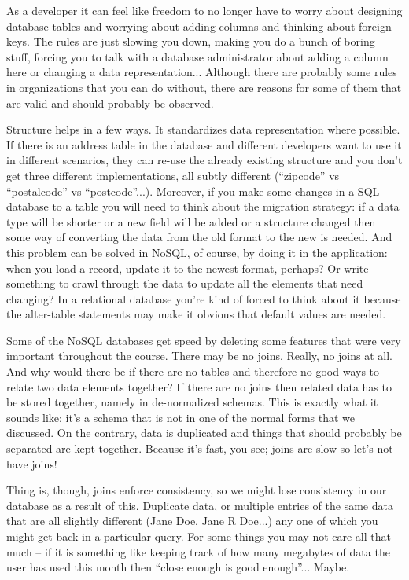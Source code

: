 \documentclass[a4paper]{report}
\begin{document}
As a developer it can feel like freedom to no longer have to worry about designing database tables and worrying about adding columns and thinking about foreign keys. The rules are just slowing you down, making you do a bunch of boring stuff, forcing you to talk with a database administrator about adding a column here or changing a data representation... Although there are probably some rules in organizations that you can do without, there are reasons for some of them that are valid and should probably be observed.

Structure helps in a few ways. It standardizes data representation where possible. If there is an address table in the database and different developers want to use it in different scenarios, they can re-use the already existing structure and you don't get three different implementations, all subtly different (``zipcode'' vs ``postalcode'' vs ``postcode''...). Moreover, if you make some changes in a SQL database to a table you will need to think about the migration strategy: if a data type will be shorter or  a new field will be added or a structure changed then some way of converting the data from the old format to the new is needed. And this problem can be solved in NoSQL, of course, by doing it in the application: when you load a record, update it to the newest format, perhaps? Or write something to crawl through the data to update all the elements that need changing? In a relational database you're kind of forced to think about it because the alter-table statements may make it obvious that default values are needed. 

Some of the NoSQL databases get speed by deleting some features that were very important throughout the course. There may be no joins. Really, no joins at all. And why would there be if there are no tables and therefore no good ways to relate two data elements together? If there are no joins then related data has to be stored together, namely in de-normalized schemas. This is exactly what it sounds like: it's a schema that is not in one of the normal forms that we discussed. On the contrary, data is duplicated and things that should probably be separated are kept together. Because it's fast, you see; joins are slow so let's not have joins!

Thing is, though, joins enforce consistency, so we might lose consistency in our database as a result of this. Duplicate data, or multiple entries of the same data that are all slightly different (Jane Doe, Jane R Doe...) any one of which you might get back in a particular query. For some things you may not care all that much -- if it is something like keeping track of how many megabytes of data the user has used this month then ``close enough is good enough''... Maybe.
\end{document}
